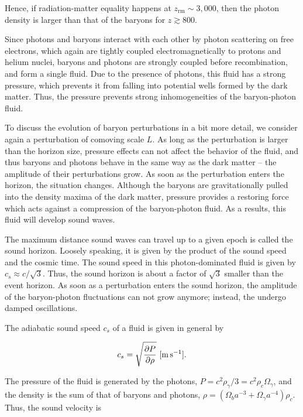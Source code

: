 \documentclass[a4paper,11pt]{article}
\begin{document}
{\noindent}Hence, if radiation-matter equality happens at $z_\mathrm{rm}\sim3,000$, then the photon density is larger than that of the baryons for $z\gtrsim800$.

{\noindent}Since photons and baryons interact with each other by photon scattering on free electrons, which again are tightly coupled electromagnetically to protons and helium nuclei, baryons and photons are strongly coupled before recombination, and form a single fluid. Due to the presence of photons, this fluid has a strong pressure, which prevents it from falling into potential wells formed by the dark matter. Thus, the pressure prevents strong inhomogeneities of the baryon-photon fluid.

{\noindent}To discuss the evolution of baryon perturbations in a bit more detail, we consider again a perturbation of comoving scale $L$. As long as the perturbation is larger than the horizon size, pressure effects can not affect the behavior of the fluid, and thus baryons and photons behave in the same way as the dark matter -- the amplitude of their perturbations grow. As soon as the perturbation enters the horizon, the situation changes. Although the baryons are gravitationally pulled into the density maxima of the dark matter, pressure provides a restoring force which acts against a compression of the baryon-photon fluid. As a results, this fluid will develop sound waves.

{\noindent}The maximum distance sound waves can
travel up to a given epoch is called the sound horizon.
Loosely speaking, it is given by the product of the sound
speed and the cosmic time. The sound speed in this photon-dominated fluid is given by $c_s\approx c/\sqrt{3}$. Thus, the sound horizon is about a factor of $\sqrt{3}$ smaller than the event horizon. As soon as a perturbation enters the sound horizon, the amplitude of the baryon-photon fluctuations can not grow anymore; instead, the undergo damped oscillations.

{\noindent}The adiabatic sound speed $c_s$ of a fluid is given in general by

\begin{align*}
    c_s = \sqrt{\frac{\partial P}{\partial\rho}} ~ [{\rm m\,s^{-1}}].
\end{align*}

{\noindent}The pressure of the fluid is generated by the photons, $P=c^2\rho_\gamma/3=c^2\rho_c\Omega_\gamma$, and the density is the sum of that of baryons and photons, $\rho=(\Omega_ba^{-3}+\Omega_\gamma a^{-4})\rho_c$. Thus, the sound velocity is
\end{document}
